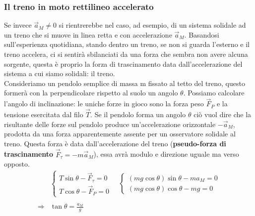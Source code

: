 \documentclass[10pt,a4paper]{article}
\begin{document}
\subsubsection*{Il treno in moto rettilineo accelerato}
Se invece $\vec{a}_M \neq 0$ si  rientrerebbe nel caso, ad esempio, di un sistema solidale ad un treno che si muove in linea retta e con accelerazione $\vec{a}_M$. Basandosi sull'esperienza quotidiana, stando dentro un treno, se non si guarda l'esterno e il treno accelera, ci si sentirà sbilanciati da una forza che sembra non avere alcuna sorgente, questa è proprio la forza di trascinamento data dall'accelerazione del sistema a cui siamo solidali: il treno.\\
Consideriamo un pendolo semplice di massa m fissato al tetto del treno, questo formerà con la perpendicolare rispetto al suolo un angolo $\theta$. Possiamo calcolare l'angolo di inclinazione: le uniche forze in gioco sono la forza peso $\vec{F}_P$ e la tensione esercitata dal filo $\vec{T}$. Se il pendolo forma un angolo $\theta$ ciò vuol dire che la risultante delle forze sul pendolo produce un'accelerazione orizzontale $-\vec{a}_M$, prodotta da una forza apparentemente assente per un osservatore solidale al treno. Questa forza è data dall'accelerazione del treno (\textbf{pseudo-forza di trascinamento} $\vec{F}_\tau=-m\vec{a}_M$), essa avrà modulo e direzione uguale ma verso opposto. 
\begin{align*}
&\begin{cases}
	T\sin\theta-\vec{F}_\tau=0\\
	T\cos\theta-\vec{F}_P=0
\end{cases}\quad
\begin{cases}
	(mg\cos\theta)\sin\theta-ma_M=0\\
	(mg\cos\theta)\cos\theta-mg=0
\end{cases}\\\\
\Rightarrow &\tan\theta=\frac{a_M}{g}
\end{align*}
\end{document}
